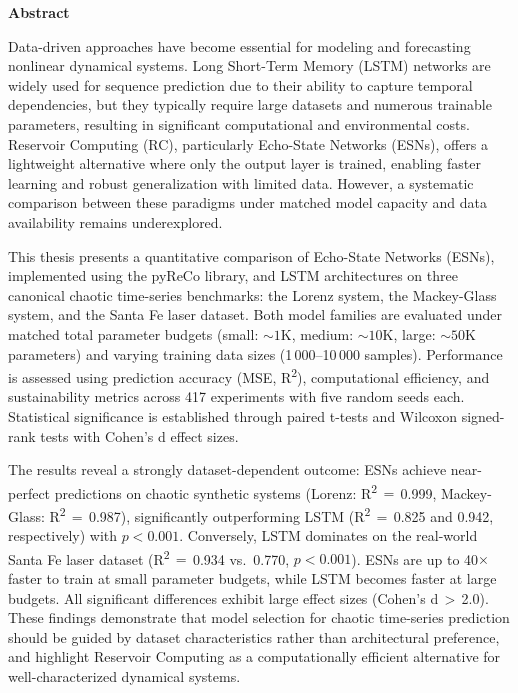\thispagestyle{empty}
\vspace*{1.0cm}

\begin{center}
    \textbf{Abstract}
\end{center}

\vspace*{0.5cm}

\noindent
Data-driven approaches have become essential for modeling and forecasting nonlinear dynamical systems. Long Short-Term Memory (LSTM) networks are widely used for sequence prediction due to their ability to capture temporal dependencies, but they typically require large datasets and numerous trainable parameters, resulting in significant computational and environmental costs. Reservoir Computing (RC), particularly Echo-State Networks (ESNs), offers a lightweight alternative where only the output layer is trained, enabling faster learning and robust generalization with limited data. However, a systematic comparison between these paradigms under matched model capacity and data availability remains underexplored.

\noindent
This thesis presents a quantitative comparison of Echo-State Networks (ESNs), implemented using the pyReCo library, and LSTM architectures on three canonical chaotic time-series benchmarks: the Lorenz system, the Mackey-Glass system, and the Santa Fe laser dataset. Both model families are evaluated under matched total parameter budgets (small: ${\sim}1$K, medium: ${\sim}10$K, large: ${\sim}50$K parameters) and varying training data sizes (1\,000--10\,000 samples). Performance is assessed using prediction accuracy (MSE, R\textsuperscript{2}), computational efficiency, and sustainability metrics across 417 experiments with five random seeds each. Statistical significance is established through paired t-tests and Wilcoxon signed-rank tests with Cohen's d effect sizes.

\noindent
The results reveal a strongly dataset-dependent outcome: ESNs achieve near-perfect predictions on chaotic synthetic systems (Lorenz: R\textsuperscript{2}\,$=$\,0.999, Mackey-Glass: R\textsuperscript{2}\,$=$\,0.987), significantly outperforming LSTM (R\textsuperscript{2}\,$=$\,0.825 and 0.942, respectively) with $p < 0.001$. Conversely, LSTM dominates on the real-world Santa Fe laser dataset (R\textsuperscript{2}\,$=$\,0.934 vs.\ 0.770, $p < 0.001$). ESNs are up to 40$\times$ faster to train at small parameter budgets, while LSTM becomes faster at large budgets. All significant differences exhibit large effect sizes (Cohen's d\,$>$\,2.0). These findings demonstrate that model selection for chaotic time-series prediction should be guided by dataset characteristics rather than architectural preference, and highlight Reservoir Computing as a computationally efficient alternative for well-characterized dynamical systems.

